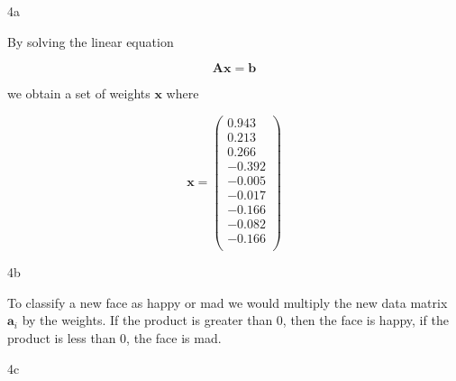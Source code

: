 \documentclass{article}
\begin{document}
\begin{homeworkProblem}

    \begin{homeworkSection}{4a}

        By solving the linear equation

        \begin{equation*}
            \bm{A x} = \bm{b}
        \end{equation*}

        \noindent we obtain a set of weights $\bm{x}$ where

        \begin{equation*}
            \bm{x} = \left(\begin{matrix}
                             0.943 \\
                             0.213 \\
                             0.266 \\
                            -0.392 \\
                            -0.005 \\
                            -0.017 \\
                            -0.166 \\
                            -0.082 \\
                            -0.166 \\
          \end{matrix}\right)       
        \end{equation*}

    \end{homeworkSection}

    \begin{homeworkSection}{4b}

        To classify a new face as happy or mad we would multiply the new data
        matrix $\bm{a}_i$ by the weights. If the product is greater than 0,
        then the face is happy, if the product is less than 0, the face is
        mad.

    \end{homeworkSection}

    \begin{homeworkSection}{4c}


\end{homeworkSection}
\end{homeworkProblem}
\end{document}
